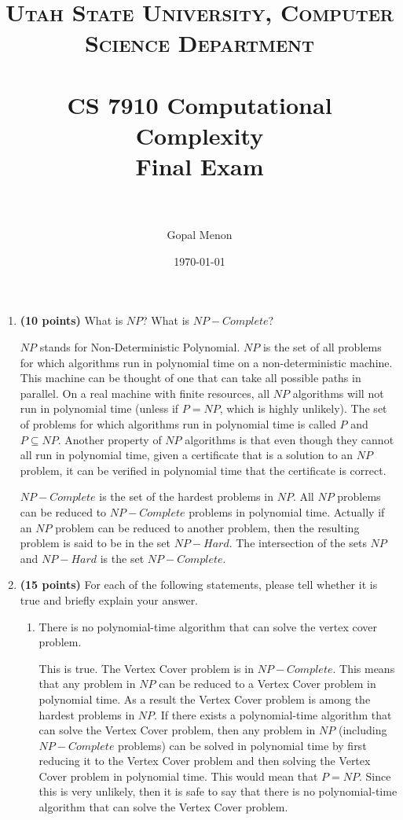 \documentclass[paper=a4, fontsize=11pt]{scrartcl} %
\title{	
\normalfont \normalsize 
\textsc{Utah State University, Computer Science Department} \\ [25pt] %
\horrule{0.5pt} \\[0.4cm] %
\huge CS 7910 Computational Complexity\\Final Exam\\ %
\horrule{2pt} \\[0.5cm] %
}
\author{Gopal Menon} %
\date{\normalsize\today} %
\numberwithin{figure}{section} %
\numberwithin{table}{section} %
\begin{document}
\maketitle %

\begin{enumerate}
\item \textbf{(10 points)} What is $NP$? What is $NP-Complete$?

$NP$ stands for Non-Deterministic Polynomial. $NP$ is the set of all problems for which algorithms run in polynomial time on a non-deterministic machine. This machine can be thought of one that can take all possible paths in parallel. On a real machine with finite resources, all $NP$ algorithms will not run in polynomial time (unless if $P = NP$, which is highly unlikely). The set of problems for which algorithms run in polynomial time is called $P$ and $P \subseteq NP$. Another property of $NP$ algorithms is that even though they cannot all run in polynomial time, given a certificate that is a solution to an $NP$ problem, it can be verified in polynomial time that the certificate is correct.

$NP-Complete$ is the set of the hardest problems in $NP$. All $NP$ problems can be reduced to $NP-Complete$ problems in polynomial time. Actually if an $NP$ problem can be reduced to another problem, then the resulting problem is said to be in the set $NP-Hard$. The intersection of the sets $NP$ and $NP-Hard$ is the set $NP-Complete$.

\item \textbf{(15 points)} For each of the following statements, please tell whether it is true and briefly explain your answer.

\begin{enumerate}

\item There is no polynomial-time algorithm that can solve the vertex cover problem.

This is true. The Vertex Cover problem is in $NP-Complete$. This means that any problem in $NP$ can be reduced to a Vertex Cover problem in polynomial time. As a result the Vertex Cover problem is among the hardest problems in $NP$. If there exists a polynomial-time algorithm that can solve the Vertex Cover problem, then any problem in $NP$ (including $NP-Complete$ problems) can be solved in polynomial time by first reducing it to the Vertex Cover problem and then solving the Vertex Cover problem in polynomial time. This would mean that $P = NP$. Since this is very unlikely, then it is safe to say that there is no polynomial-time algorithm that can solve the Vertex Cover problem.


\end{enumerate}
\end{enumerate}
\end{document}
